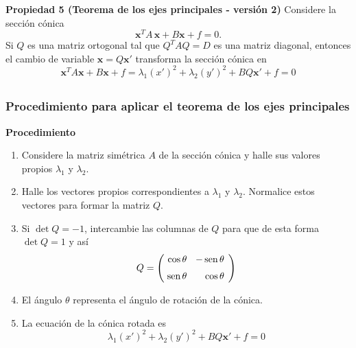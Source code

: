 {\begin{frame}
		\vspace{-1mm}
		\begin{prop}{\textbf{Propiedad 5 (Teorema de los ejes principales - versión 2)}}\justifying 
			Considere la sección cónica
			\[
				\mathbf{x}^T A\, \mathbf{x} + B\mathbf{x} + f = 0.
			\]
			Si $Q$ es una matriz ortogonal tal que $Q^TAQ = D$ es una matriz diagonal, entonces 
			el cambio de variable $\mathbf{x}=Q\mathbf{x'}$ transforma la sección cónica en
			\[
			\mathbf{x}^TA \mathbf{x} +  B\mathbf{x} + f= 
			\lambda_1\left(x'\right)^2 + \lambda_2\left(y'\right)^2 + BQ\mathbf{x'} + f = 0
			\]
		\end{prop}
		
\end{frame}
}


\subsection{}

{\nologo 
\begin{frame}\frametitle{Procedimiento para aplicar el teorema de los ejes principales}
	
	\begin{ejem}{\textbf{Procedimiento}}\justifying		
		\begin{enumerate}\justifying
			\item Considere la matriz simétrica $A$ de la sección cónica y halle sus valores propios $\lambda_1$
			y $\lambda_2$.
			\item Halle los vectores propios correspondientes a $\lambda_1$ y $\lambda_2$. Normalice estos vectores
			para formar la matriz $Q$.			
			\item Si $\det Q=-1$, intercambie las columnas de $Q$ para que de esta forma $\det Q=1$ y así
			\[
			Q=
			\left(
			\begin{array}{@{\hspace{0.5\tabcolsep}}r@{\hspace{1.5\tabcolsep}}r@{\hspace{0.7\tabcolsep}}}
			\cos\theta & -\sen\theta   \\[2mm]
			\sen\theta & \cos\theta  
			\end{array}
			\right)		
			\]
			\item El ángulo $\theta$ representa el ángulo de rotación de la cónica.
			\item La ecuación de la cónica rotada es
			\[
				\lambda_1\left(x'\right)^2 + \lambda_2\left(y'\right)^2 + BQ\mathbf{x'} + f = 0
			\]
		\end{enumerate}
	\end{ejem}		
	
\end{frame}
}

